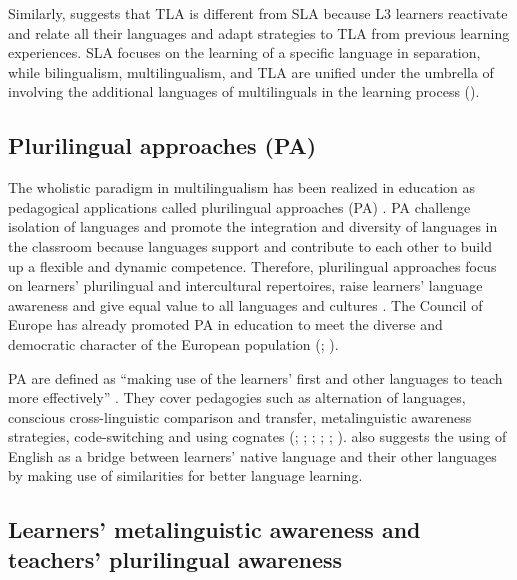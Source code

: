 \documentclass[output=paper]{../langscibook}
\begin{document}
Similarly, \citet{Cenoz2013b} suggests that TLA is different from SLA because L3 learners reactivate and relate all their languages and adapt strategies to TLA from previous learning experiences. SLA focuses on the learning of a specific language in separation, while bilingualism, multilingualism, and TLA are unified under the umbrella of involving the additional languages of multilinguals in the learning process (\citealt{CenozGorter2011}).



\subsection{Plurilingual approaches (PA)}



The wholistic paradigm in multilingualism has been realized in education as pedagogical applications called plurilingual approaches (PA) \citep{CouncilOfEurope2001,BeaccoEtAl2010,Cenoz2013a}. PA challenge isolation of languages and promote the integration and diversity of languages in the classroom because languages support and contribute to each other to build up a flexible and dynamic competence. Therefore, plurilingual approaches focus on learners' plurilingual and intercultural repertoires, raise learners’ language awareness and give equal value to all languages and cultures \citep{BeaccoEtAl2010}. The Council of Europe has already promoted PA in education to meet the diverse and democratic character of the European population (\citealt{CouncilOfEurope2001}; \citealt{BeaccoEtAl2010}).

PA are defined as “making use of the learners’ first and other languages to teach more effectively” \citep[102]{Otwinowska2014}. They cover pedagogies such as alternation of languages, conscious cross-linguistic comparison and transfer, metalinguistic awareness strategies, code-switching and using cognates (\citealt{CouncilOfEurope2001}; \citealt{BeaccoEtAl2010}; \citealt{HerdinaJessner2002}; \citealt{HufeisenNeuner2004}; \citealt{Cenoz2013b};  \citealt{JessnerEtAl2016}).  \citet{Otwinowska2014} also suggests the using of English as a bridge between learners’ native language and their other languages by making use of similarities for better language learning.



\subsection{Learners’ metalinguistic awareness and teachers’ plurilingual awareness}
\end{document}
